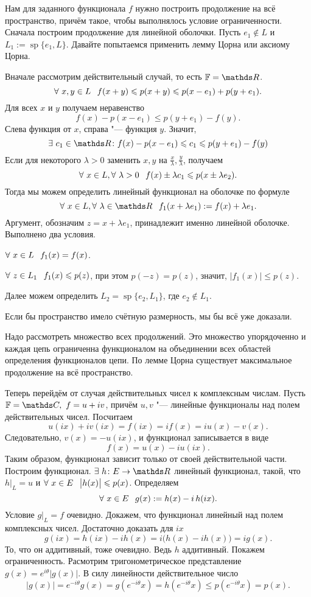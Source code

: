 \begin{Proof}
  Нам для заданного функционала $f$ нужно построить продолжение на всё пространство, причём такое, чтобы выполнялось условие ограниченности. Сначала построим продолжение для линейной оболочки. Пусть $e_1\not\in L$ и $L_1:=\mathop{sp}\{e_1,L\}$. Давайте попытаемся применить лемму Цорна или аксиому Цорна.

Вначале рассмотрим действительный случай, то есть $\F = \R$.
\[
  \forall\ x,y\in L\hskip .75em plus.1em minus.08em\relax f(x+y)\leqslant p(x+y)\leqslant p(x- e_1) + p(y+ e_1).
\]
Для всех $x$ и $y$ получаем неравенство
\[
  f(x) - p(x-e_1)\le p(y+e_1)-f(y).
\]
Слева функция от $x$, справа "--- функция $y$. Значит, 
\[
  \exists\ c_1\in \R\colon   f(x) - p(x-e_1)\le c_1\le p(y+e_1)-f(y)
\]
Если для некоторого  $\lambda>0$ заменить $x,y$ на $\frac x\lambda, \frac y\lambda$, получаем
\[
  \forall\ x\in L,\forall\ \lambda>0\pau f(x) \pm \lambda c_1\le p(x\pm \lambda e_2).
\]
Тогда мы можем определить линейный функционал на оболочке по формуле
\[
  \forall\ x\in L,\forall\ \lambda\in\R\pau f_1(x+\lambda e_1): = f(x) + \lambda e_1.
\]
Аргумент, обозначим $z = x+\lambda e_1$, принадлежит именно линейной оболочке. Выполнено два условия.
\begin{roItems}
  \item $\forall\ x\in L\pau f_1(x) = f(x)$.
  \item $\forall\ z\in L_1\pau f_1(x)\le p(z)$, при этом $p(-z) = p(z)$, значит, $\big|f_1(x)\big|\le p(z)$.
\end{roItems}
Далее можем определить $L_2=\mathop{sp}\{e_2,L_1\}$, где $e_2\not\in L_1$.

Если бы пространство имело счётную размерность, мы бы всё уже доказали.

Надо рассмотреть множество всех продолжений. Это множество упорядоченно и каждая цепь ограниченна функционалом на объединении всех областей определения функционалов цепи. По лемме Цорна существует максимальное продолжение на всё пространство.

Теперь перейдём от случая действительных чисел к комплексным числам. Пусть $\F=\C,\ f = u+iv$, причём $u,v$ "--- линейные функционалы над полем действительных чисел. Посчитаем
\[
  u(ix) + i v(ix) = f(ix) = i f(x) = i u(x) - v(x).
\]
Следовательно, $v(x) = -u(ix) $, и функционал записывается в виде
\[
  f(x) = u(x) - i u(ix).
\]
Таким образом, функционал зависит только от своей действительной части. Построим функционал. $\exists\ h\colon E\to\R$ линейный функционал, такой, что $h\big|_{L} = u$ и $\forall\ x\in E\pau \big|h(x)\big|\le p(x)$. Определяем
\[
  \forall\ x\in E\pau g(x):= h(x) - i\,h(ix).
\]
Условие $g\big|_{L}=f$ очевидно. Докажем, что функционал линейный над полем комплексных чисел. Достаточно доказать для $ix$
\[
  g(ix) = h(ix)  - i h(x) = i\big(h(x) - i h(x)\big) = i g(x).
\]
То, что он аддитивный, тоже очевидно. Ведь $h$ аддитивный. Покажем ограниченность. Расмотрим тригонометрическое представление $g(x) = e^{i\theta}\big|g(x)\big|$. В силу линейности действительное число
\[
  \big|g(x)\big| = e^{-i\theta} g(x) = g(e^{-i\theta}x) = h(e^{-i\theta}x)\le p(e^{-i\theta}x) = p(x).
\]
\end{Proof}

